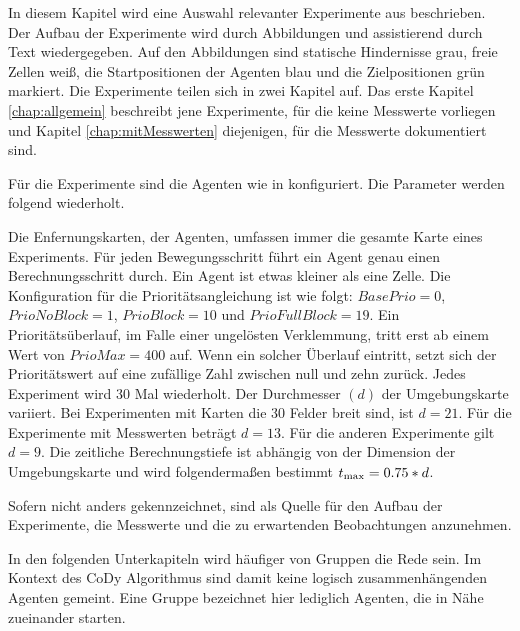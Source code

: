In diesem Kapitel wird eine Auswahl relevanter Experimente aus \cite{book:regele} beschrieben. Der Aufbau der Experimente wird durch Abbildungen und assistierend durch Text wiedergegeben. Auf den Abbildungen sind statische Hindernisse grau, freie Zellen weiß, die Startpositionen der Agenten blau und die Zielpositionen grün markiert. Die Experimente teilen sich in zwei Kapitel auf. Das erste Kapitel \ref{chap:allgemein} beschreibt jene Experimente, für die keine Messwerte vorliegen und Kapitel \ref{chap:mitMesswerten} diejenigen, für die Messwerte dokumentiert sind.

Für die Experimente sind die Agenten wie in \cite{book:regele} konfiguriert. Die Parameter werden folgend wiederholt.

Die Enfernungskarten, der Agenten, umfassen immer die gesamte Karte eines Experiments. Für jeden Bewegungsschritt führt ein Agent genau einen Berechnungsschritt durch. Ein Agent ist etwas kleiner als eine Zelle. Die Konfiguration für die Prioritätsangleichung ist wie folgt:\newline
\(BasePrio=0\), \(PrioNoBlock=1\), \(PrioBlock=10\) und \(PrioFullBlock=19\). Ein Prioritätsüberlauf, im Falle einer ungelösten Verklemmung, tritt erst ab einem Wert von \(PrioMax=400\) auf. Wenn ein solcher Überlauf eintritt, setzt sich der Prioritätswert auf eine zufällige Zahl zwischen null und zehn zurück. Jedes Experiment wird 30 Mal wiederholt. 
Der Durchmesser \((d)\) der Umgebungskarte variiert. Bei Experimenten mit Karten die 30 Felder breit sind, ist \(d=21\). Für die Experimente mit Messwerten beträgt \(d=13\). Für die anderen Experimente gilt \(d=9\). Die zeitliche Berechnungstiefe ist abhängig von der Dimension der Umgebungskarte und wird folgendermaßen bestimmt \(t\textsubscript{max}=0.75*d\).

Sofern nicht anders gekennzeichnet, sind \cite{book:regele} als Quelle für den Aufbau der Experimente, die Messwerte und die zu erwartenden Beobachtungen anzunehmen.

In den folgenden Unterkapiteln wird häufiger von Gruppen die Rede sein. Im Kontext des CoDy Algorithmus sind damit keine logisch zusammenhängenden Agenten gemeint. Eine Gruppe bezeichnet hier lediglich Agenten, die in Nähe zueinander starten.
